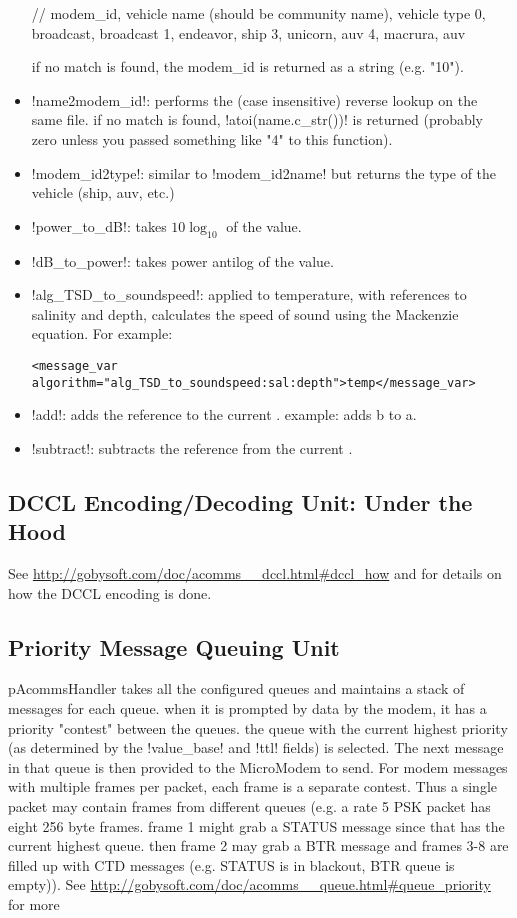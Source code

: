 \begin{itemize}
\begin{boxedverbatim}
// modem_id, vehicle name (should be community name), vehicle type
0, broadcast, broadcast
1, endeavor, ship
3, unicorn, auv
4, macrura, auv
\end{boxedverbatim}
\resetbvlinenumber
if no match is found, the modem\_id is returned as a string (e.g. "10").
\item !name2modem_id!: performs the (case insensitive) reverse lookup on the same file. if no match is found, !atoi(name.c_str())! is returned (probably zero unless you passed something like "4" to this function).
\item !modem_id2type!: similar to !modem_id2name! but returns the type of the vehicle (ship, auv, etc.)
\item !power_to_dB!: takes $10\log_{10}$ of the value.
\item !dB_to_power!: takes power antilog of the value.
\item !alg_TSD_to_soundspeed!: applied to temperature, with references to salinity and depth, calculates the speed of sound using the Mackenzie equation. For example:
\begin{verbatim}<message_var algorithm="alg_TSD_to_soundspeed:sal:depth">temp</message_var>\end{verbatim}
\item !add!: adds the reference  to the current . example:  adds b to a.
\item !subtract!: subtracts the reference  from the current .
\end{itemize}

\subsection{DCCL Encoding/Decoding Unit: Under the Hood}

See \url{http://gobysoft.com/doc/acomms__dccl.html#dccl_how} and \cite{dccl_oceans10} for details on how the DCCL encoding is done.

\subsection{Priority Message Queuing Unit}

pAcommsHandler takes all the configured queues and maintains a stack of messages for each queue. when it is prompted by data by the modem, it has a priority "contest" between the queues. the queue with the current highest priority (as determined by the !value_base! and !ttl! fields) is selected. The next message in that queue is then provided to the MicroModem to send. For modem messages with multiple frames per packet, each frame is a separate contest. Thus a single packet may contain frames from different
 queues (e.g. a rate 5 PSK packet has eight 256 byte frames. frame 1 might grab a STATUS message since that has the current highest queue. then frame 2 may grab a BTR message and frames 3-8 are filled up with CTD messages (e.g. STATUS is in blackout, BTR queue is empty)). See \url{http://gobysoft.com/doc/acomms__queue.html#queue_priority} for more

